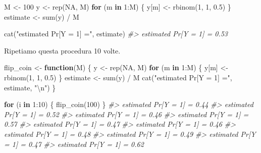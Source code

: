 \documentclass[
  11pt,
]{krantz}
\makeatletter
\newenvironment{Shaded}{\begin{snugshade}}{\end{snugshade}}
\newcommand{\CommentTok}[1]{\textcolor[rgb]{0.37,0.37,0.37}{\textit{#1}}}
\newcommand{\ConstantTok}[1]{\textcolor[rgb]{0,0,0}{#1}}
\newcommand{\ControlFlowTok}[1]{\textcolor[rgb]{0.27,0.27,0.27}{\textbf{#1}}}
\newcommand{\DecValTok}[1]{\textcolor[rgb]{0.06,0.06,0.06}{#1}}
\newcommand{\FloatTok}[1]{\textcolor[rgb]{0.06,0.06,0.06}{#1}}
\newcommand{\FunctionTok}[1]{\textcolor[rgb]{0,0,0}{#1}}
\newcommand{\NormalTok}[1]{#1}
\newcommand{\OtherTok}[1]{\textcolor[rgb]{0.37,0.37,0.37}{#1}}
\newcommand{\SpecialCharTok}[1]{\textcolor[rgb]{0,0,0}{#1}}
\newcommand{\StringTok}[1]{\textcolor[rgb]{0.5,0.5,0.5}{#1}}
\newenvironment{kframe}{%
\medskip{}
\setlength{\fboxsep}{.8em}
 \def\at@end@of@kframe{}%
 \ifinner\ifhmode%
  \def\at@end@of@kframe{\end{minipage}}%
  \begin{minipage}{\columnwidth}%
 \fi\fi%
 \def\FrameCommand##1{\hskip\@totalleftmargin \hskip-\fboxsep
 \colorbox{shadecolor}{##1}\hskip-\fboxsep
     \hskip-\linewidth \hskip-\@totalleftmargin \hskip\columnwidth}%
 \MakeFramed {\advance\hsize-\width
   \@totalleftmargin\z@ \linewidth\hsize
   \@setminipage}}%
 {\par\unskip\endMakeFramed%
 \at@end@of@kframe}
\renewenvironment{Shaded}{\begin{kframe}}{\end{kframe}}
\theoremstyle{definition}
\theoremstyle{definition}
\theoremstyle{definition}
\theoremstyle{definition}
\theoremstyle{remark}
\makeatother
\begin{document}
\begin{Shaded}
\begin{Highlighting}[]
\NormalTok{M }\OtherTok{\textless{}{-}} \DecValTok{100}
\NormalTok{y }\OtherTok{\textless{}{-}} \FunctionTok{rep}\NormalTok{(}\ConstantTok{NA}\NormalTok{, M)}
\ControlFlowTok{for}\NormalTok{ (m }\ControlFlowTok{in} \DecValTok{1}\SpecialCharTok{:}\NormalTok{M) \{}
\NormalTok{  y[m] }\OtherTok{\textless{}{-}} \FunctionTok{rbinom}\NormalTok{(}\DecValTok{1}\NormalTok{, }\DecValTok{1}\NormalTok{, }\FloatTok{0.5}\NormalTok{)}
\NormalTok{\}}
\NormalTok{estimate }\OtherTok{\textless{}{-}} \FunctionTok{sum}\NormalTok{(y) }\SpecialCharTok{/}\NormalTok{ M}

\FunctionTok{cat}\NormalTok{(}\StringTok{"estimated Pr[Y = 1] ="}\NormalTok{, estimate)}
\CommentTok{\#\textgreater{} estimated Pr[Y = 1] = 0.53}
\end{Highlighting}
\end{Shaded}

Ripetiamo questa procedura 10 volte.

\begin{Shaded}
\begin{Highlighting}[]
\NormalTok{flip\_coin }\OtherTok{\textless{}{-}} \ControlFlowTok{function}\NormalTok{(M) \{}
\NormalTok{  y }\OtherTok{\textless{}{-}} \FunctionTok{rep}\NormalTok{(}\ConstantTok{NA}\NormalTok{, M)}
  \ControlFlowTok{for}\NormalTok{ (m }\ControlFlowTok{in} \DecValTok{1}\SpecialCharTok{:}\NormalTok{M) \{}
\NormalTok{    y[m] }\OtherTok{\textless{}{-}} \FunctionTok{rbinom}\NormalTok{(}\DecValTok{1}\NormalTok{, }\DecValTok{1}\NormalTok{, }\FloatTok{0.5}\NormalTok{)}
\NormalTok{  \}}
\NormalTok{  estimate }\OtherTok{\textless{}{-}} \FunctionTok{sum}\NormalTok{(y) }\SpecialCharTok{/}\NormalTok{ M}
  \FunctionTok{cat}\NormalTok{(}\StringTok{"estimated Pr[Y = 1] ="}\NormalTok{, estimate, }\StringTok{"}\SpecialCharTok{\textbackslash{}n}\StringTok{"}\NormalTok{)}
\NormalTok{\}}
\end{Highlighting}
\end{Shaded}

\begin{Shaded}
\begin{Highlighting}[]
\ControlFlowTok{for}\NormalTok{ (i }\ControlFlowTok{in} \DecValTok{1}\SpecialCharTok{:}\DecValTok{10}\NormalTok{) \{}
  \FunctionTok{flip\_coin}\NormalTok{(}\DecValTok{100}\NormalTok{)}
\NormalTok{\}}
\CommentTok{\#\textgreater{} estimated Pr[Y = 1] = 0.44 }
\CommentTok{\#\textgreater{} estimated Pr[Y = 1] = 0.52 }
\CommentTok{\#\textgreater{} estimated Pr[Y = 1] = 0.46 }
\CommentTok{\#\textgreater{} estimated Pr[Y = 1] = 0.57 }
\CommentTok{\#\textgreater{} estimated Pr[Y = 1] = 0.47 }
\CommentTok{\#\textgreater{} estimated Pr[Y = 1] = 0.46 }
\CommentTok{\#\textgreater{} estimated Pr[Y = 1] = 0.48 }
\CommentTok{\#\textgreater{} estimated Pr[Y = 1] = 0.49 }
\CommentTok{\#\textgreater{} estimated Pr[Y = 1] = 0.47 }
\CommentTok{\#\textgreater{} estimated Pr[Y = 1] = 0.62}
\end{Highlighting}
\end{Shaded}
\end{document}
